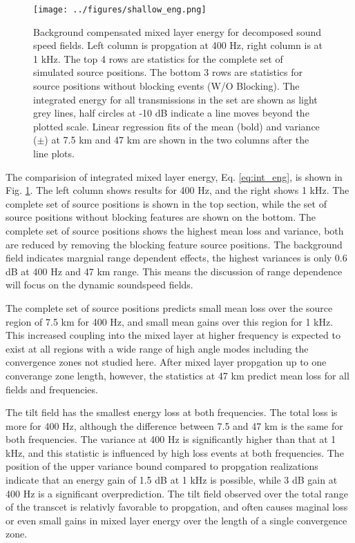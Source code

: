 \documentclass[preprint,NumberedRefs]{JASA}
\begin{document}
\begin{figure}
\texttt{[image: ../figures/shallow\_eng.png]}
    \caption{Background compensated mixed layer energy for decomposed sound speed fields. Left column is propgation at 400 Hz, right column is at 1 kHz. The top 4 rows are statistics for the complete set of simulated source positions. The bottom 3 rows are statistics for source positions without blocking events (W/O Blocking). The integrated energy for all transmissions in the set are shown as light grey lines, half circles at -10 dB indicate a line moves beyond the plotted scale. Linear regression fits of the mean (bold) and variance ($\pm$) at 7.5 km and 47 km are shown in the two columns after the line plots.}
    \label{fig:shal_eng}
\end{figure}

The comparision of integrated mixed layer energy, Eq. \eqref{eq:int_eng}, is shown in Fig. \ref{fig:shal_eng}. The left column shows results for 400 Hz, and the right shows 1 kHz. The complete set of source positions is shown in the top section, while the set of source positions without blocking features are shown on the bottom. The complete set of source positions shows the highest mean loss and variance, both are reduced by removing the blocking feature source positions. The background field indicates margnial range dependent effects, the highest variances is only 0.6 dB at 400 Hz and 47 km range. This means the discussion of range dependence will focus on the dynamic soundspeed fields.

The complete set of source positions predicts small mean loss over the source region of 7.5 km for 400 Hz, and small mean gains over this region for 1 kHz. This increased coupling into the mixed layer at higher frequency is expected to exist at all regions with a wide range of high angle modes including the convergence zones not studied here. After mixed layer propgation up to one converange zone length, however, the statistics at 47 km predict mean loss for all fields and frequencies.

The tilt field has the smallest energy loss at both frequencies. The total loss is more for 400 Hz, although the difference between 7.5 and 47 km is the same for both frequencies. The variance at 400 Hz is significantly higher than that at 1 kHz, and this statistic is influenced by high loss events at both frequencies. The position of the upper variance bound compared to propgation realizations indicate that an energy gain of 1.5 dB at 1 kHz is possible, while 3 dB gain at 400 Hz is a significant overprediction. The tilt field observed over the total range of the transcet is relativly favorable to propgation, and often causes maginal loss or even small gains in mixed layer energy over the length of a single convergence zone.
\end{document}
